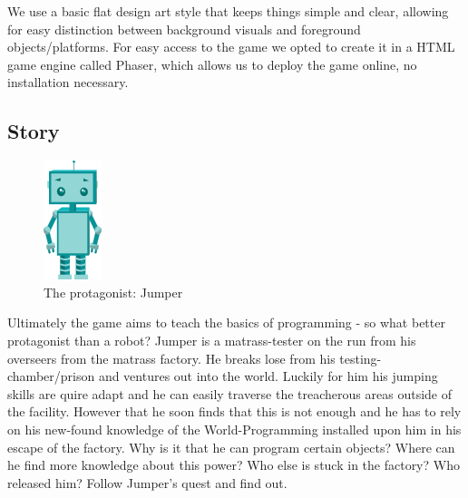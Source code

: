 \documentclass[a4paper,twoside,12pt]{article}
\begin{document}
We use a basic flat design art style that keeps things simple and clear, allowing for easy distinction between background visuals and foreground objects/platforms. For easy access to the game we opted to create it in a HTML game engine called Phaser, which allows us to deploy the game online, no installation necessary.

\subsection{Story}

\begin{figure}[H]
\centering
\includegraphics[scale=1.5]{jumper}
\caption{The protagonist: Jumper}
\end{figure}

Ultimately the game aims to teach the basics of programming - so what better protagonist than a robot?
Jumper is a matrass-tester on the run from his overseers from the matrass factory. He breaks lose from his testing-chamber/prison and ventures out into the world. Luckily for him his jumping skills are quire adapt and he can easily traverse the treacherous areas outside of the facility. However that he soon finds that this is not enough and he has to rely on his new-found knowledge of the World-Programming installed upon him in his escape of the factory. Why is it that he can program certain objects? Where can he find more knowledge about this power? Who else is stuck in the factory? Who released him? Follow Jumper's quest and find out.
\end{document}
